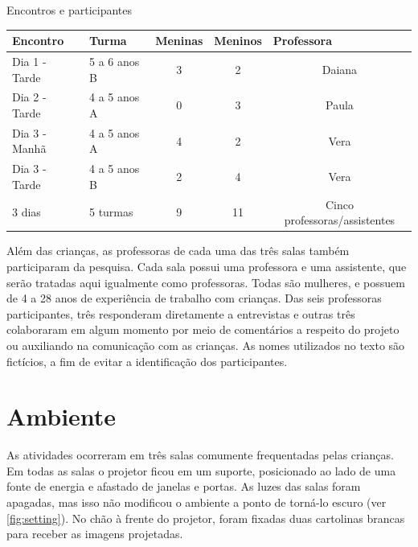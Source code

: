  \begin{quadro}[!h]
 		\setlength{\extrarowheight}{5pt}
        \begin{center}
        \caption{Encontros e participantes}
        \label{quadro:participants}
        \begin{tabular}{@{}llccc@{}}
            \toprule
            Encontro & Turma & \multicolumn{1}{l}{Meninas} & \multicolumn{1}{l}{Meninos} & \multicolumn{1}{l}{Professora} \\ \midrule
            Dia 1 - Tarde & 5 a 6 anos B & 3 & 2 & Daiana \\
            Dia 2 - Tarde & 4 a 5 anos A & 0 & 3 & Paula \\
            Dia 3 - Manhã & 4 a 5 anos A & 4 & 2 & Vera \\
            Dia 3 - Tarde & 4 a 5 anos B & 2 & 4 & Vera \\ \midrule
            3 dias        & 5 turmas     & 9 & 11 & Cinco professoras/assistentes \\ \bottomrule 
            \end{tabular}
        \end{center}
        \sourceauthor
    \end{quadro}

Além das crianças, as professoras de cada uma das três salas também participaram da pesquisa. Cada sala possui uma professora e uma assistente, que serão tratadas aqui igualmente como professoras. Todas são mulheres, e possuem de 4 a 28 anos de experiência de trabalho com crianças. Das seis professoras participantes, três responderam diretamente a entrevistas e outras três colaboraram em algum momento por meio de comentários a respeito do projeto ou auxiliando na comunicação com as crianças. As nomes utilizados no texto são fictícios, a fim de evitar a identificação dos participantes.

\section{Ambiente}
As atividades ocorreram em três salas comumente frequentadas pelas crianças. Em todas as salas o projetor ficou em um suporte, posicionado ao lado de uma fonte de energia e afastado de janelas e portas. As luzes das salas foram apagadas, mas isso não modificou o ambiente a ponto de torná-lo escuro (ver \autoref{fig:setting}). No chão à frente do projetor, foram fixadas duas cartolinas brancas para receber as imagens projetadas.

